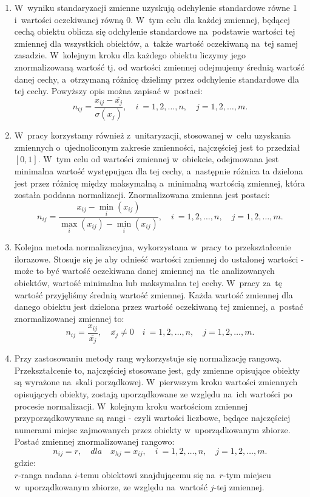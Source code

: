 \documentclass[12pt,a4paper]{report}
\begin{document}
\begin{enumerate}
\item W~wyniku standaryzacji zmienne uzyskują odchylenie standardowe równe 1 i~wartości oczekiwanej  równą 0. W~tym celu dla każdej zmiennej, będącej cechą obiektu oblicza się odchylenie standardowe na~podstawie wartości tej zmiennej dla wszystkich obiektów, a~także wartość oczekiwaną na~tej samej zasadzie. W~kolejnym kroku dla każdego obiektu liczymy jego znormalizowaną wartość tj. od wartości zmiennej odejmujemy średnią wartość danej cechy, a~otrzymaną różnicę dzielimy przez odchylenie standardowe dla tej cechy. Powyższy opis można zapisać w~postaci: 
$$
n_{ij}=\frac{x_{ij} - \overline{x_{j}}}{\sigma(x_j)}, \quad i~= 1,2, \ldots, n, \quad j=1,2,\ldots, m.
$$



\item W~pracy korzystamy również z~unitaryzacji, stosowanej w~celu uzyskania zmiennych o~ujednoliconym zakresie zmienności, najczęściej jest to przedział $[0,1]$. W~tym celu od wartości zmiennej w~obiekcie, odejmowana jest minimalna wartość występująca dla tej cechy, a~następnie różnica ta dzielona jest przez różnicę między maksymalną a~minimalną wartością zmiennej, która została poddana normalizacji. Znormalizowana zmienna jest postaci:
$$
n_{ij}=\frac{x_{ij} - \min\limits_{i}(x_{ij})}{\max\limits_{i} (x_{ij}) - \min\limits_{i} (x_{ij})}, \quad i~= 1,2, \ldots, n, \quad j=1,2,\ldots, m. 
$$
\item Kolejna metoda normalizacyjna, wykorzystana w~pracy to przekształcenie ilorazowe. Stosuje się  je aby odnieść wartości zmiennej do ustalonej wartości - może to być wartość oczekiwana danej zmiennej na~tle analizowanych obiektów, wartość minimalna lub maksymalna tej cechy. W~pracy za~tę wartość przyjęliśmy średnią wartość zmiennej. Każda wartość zmiennej dla danego obiektu jest dzielona przez wartość oczekiwaną tej zmiennej, a~postać znormalizowanej zmiennej to:
$$
n_{ij}=\frac{x_{ij}}{\overline{x_j}}, \quad \overline{x_j} \neq 0 \quad i~= 1,2, \ldots, n, \quad j=1,2,\ldots, m.
$$ 
\item Przy zastosowaniu metody rang wykorzystuje się normalizację rangową. Przekształcenie to, najczęściej stosowane jest, gdy zmienne opisujące obiekty są wyrażone na~skali porządkowej. W~pierwszym kroku wartości zmiennych opisujących obiekty, zostają uporządkowane ze względu na~ich wartości po procesie normalizacji. W~kolejnym kroku wartościom zmiennej przyporządkowywane są rangi - czyli wartości liczbowe, będące najczęściej numerami miejsc zajmowanych przez obiekty w~uporządkowanym zbiorze. Postać zmiennej znormalizowanej rangowo:
$$
n_{ij}=r, \quad dla \quad x_{hj}=x_{ij}, \quad i~= 1,2, \ldots, n, \quad j=1,2,\ldots, m.
$$
gdzie:\\ 
$r$-ranga nadana $i$-temu obiektowi znajdującemu się na~$r$-tym miejscu w~uporządkowanym zbiorze, ze względu na~wartość $j$-tej zmiennej. 
\end{enumerate}
\end{document}
